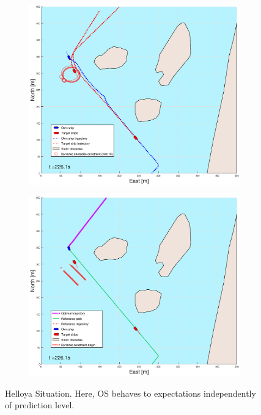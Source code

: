 \begin{figure}[ht]
\begin{subfigure}[b]{0.499\textwidth}
    \end{subfigure}
    \hfill
    \\
    \begin{subfigure}[b]{0.49\textwidth}
        \centering
        \includegraphics[width=\textwidth]{Images/Figures/Helloya/_Simple_0fig1_time=226}
    \end{subfigure}
    \hfill
    \begin{subfigure}[b]{0.499\textwidth}
        \centering
        \includegraphics[width=\textwidth]{Images/Figures/Helloya/_Simple_0fig999_time=226}
    \end{subfigure}
    \hfill
    \caption{Helloya Situation. Here, \gls{OS} behaves to expectations independently of prediction level.}
\end{figure}


